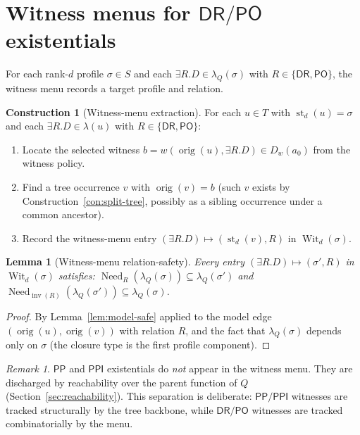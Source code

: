 \documentclass[11pt]{article}
\newtheorem{lemma}[theorem]{Lemma}
\theoremstyle{definition}
\newtheorem{construction}[theorem]{Construction}
\theoremstyle{remark}
\newtheorem{remark}[theorem]{Remark}
\newcommand{\DR}{\mathsf{DR}}
\newcommand{\PO}{\mathsf{PO}}
\newcommand{\PP}{\mathsf{PP}}
\newcommand{\PPI}{\mathsf{PPI}}
\newcommand{\st}{\operatorname{st}}
\newcommand{\inv}{\operatorname{inv}}
\newcommand{\orig}{\operatorname{orig}}
\newcommand{\Need}{\operatorname{Need}}
\newcommand{\Wit}{\operatorname{Wit}}
\begin{document}
\section{Witness menus for $\DR/\PO$ existentials}
\label{sec:witness-menu}

For each rank-$d$ profile $\sigma \in S$ and each $\exists R.D \in
\lambda_Q(\sigma)$ with $R \in \{\DR, \PO\}$, the witness menu
records a target profile and relation.

\begin{construction}[Witness-menu extraction]\label{con:witness-menu}
For each $u \in T$ with $\st_d(u) = \sigma$ and each $\exists R.D
\in \lambda(u)$ with $R \in \{\DR,\PO\}$:
\begin{enumerate}
\item Locate the selected witness $b = w(\orig(u),\exists R.D) \in
  D_w(a_0)$ from the witness policy.
\item Find a tree occurrence $v$ with $\orig(v) = b$ (such $v$
  exists by Construction~\ref{con:split-tree}, possibly as a sibling
  occurrence under a common ancestor).
\item Record the witness-menu entry $(\exists R.D) \mapsto
  (\st_d(v), R)$ in $\Wit_d(\sigma)$.
\end{enumerate}
\end{construction}

\begin{lemma}[Witness-menu relation-safety]\label{lem:witness-safe}
Every entry $(\exists R.D) \mapsto (\sigma', R)$ in $\Wit_d(\sigma)$
satisfies: $\Need_R(\lambda_Q(\sigma)) \subseteq \lambda_Q(\sigma')$
and $\Need_{\inv(R)}(\lambda_Q(\sigma')) \subseteq
\lambda_Q(\sigma)$.
\end{lemma}

\begin{proof}
By Lemma~\ref{lem:model-safe} applied to the model edge
$(\orig(u),\orig(v))$ with relation $R$, and the fact that
$\lambda_Q(\sigma)$ depends only on $\sigma$ (the closure type is
the first profile component).
\end{proof}

\begin{remark}
$\PP$ and $\PPI$ existentials do \emph{not} appear in the witness
menu.  They are discharged by reachability over the parent function
of $Q$ (Section~\ref{sec:reachability}).  This separation is
deliberate: $\PP/\PPI$ witnesses are tracked structurally by the
tree backbone, while $\DR/\PO$ witnesses are tracked
combinatorially by the menu.
\end{remark}
\end{document}
